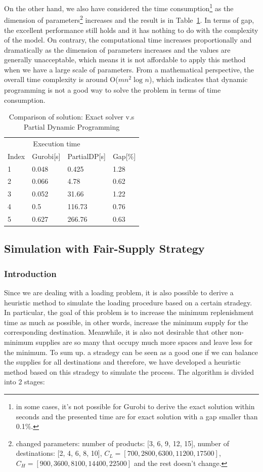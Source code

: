 \documentclass{article}
\begin{document}
On the other hand, we also have considered the time consumption\footnote{in some cases, it's not possible for Gurobi to derive the exact solution within seconds and the presented time are for exact solution with a gap smaller than 0.1\%.} as the dimension of parameters\footnote{changed parameters: number of products: [3, 6, 9, 12, 15], number of destinations: [2, 4, 6, 8, 10], $C_L=[700, 2800, 6300, 11200, 17500]$, $C_H=[900, 3600, 8100, 14400, 22500]$ and the rest doesn't change.} increases and the result is in Table~\ref{tab:exact_heu1}. In terms of gap, the excellent performance still holds and it has nothing to do with the complexity of the model. On contrary, the computational time increases proportionally and dramatically as the dimension of parameters increases and the values are generally unacceptable, which means it is not affordable to apply this method when we have a large scale of parameters. From a mathematical perspective, the overall time complexity is around O($mn^2\log_{}n$), which indicates that dynamic programming is not a good way to solve the problem in terms of time consumption.

\begin{table}[ht]
 \caption{Comparison of solution: Exact solver v.s Partial Dynamic Programming}
  \centering
  \begin{tabular}{llll}
    \toprule
    \multicolumn{3}{c}{Execution time}                   \\
    \cmidrule(r){2-3}
    Index   & Gurobi[s]     & PartialDP[s]      & Gap[\%] \\
    \midrule
    1	&	0.048	&	0.425	&	1.28	\\
    2	&	0.066	&	4.78	&	0.62	\\
    3	&	0.052	&	31.66	&	1.22	\\
    4	&	0.5	&	116.73	&	0.76	\\
    5	&	0.627	&	266.76	&	0.63	\\
    \bottomrule
  \end{tabular}
  \label{tab:exact_heu1}
\end{table}

\subsection{Simulation with Fair-Supply Strategy}

\subsubsection{Introduction}
Since we are dealing with a loading problem, it is also possible to derive a heuristic method to simulate the loading procedure based on a certain stradegy. In particular, the goal of this problem is to increase the minimum replenishment time as much as possible, in other words, increase the minimum supply for the corresponding destination. Meanwhile, it is also not desirable that other non-minimum supplies are so many that occupy much more spaces and leave less for the minimum. To sum up. a stradegy can be seen as a good one if we can balance the supplies for all destinations and therefore, we have developed a heuristic method based on this stradegy to simulate the process. The algorithm is divided into 2 stages:
\end{document}
